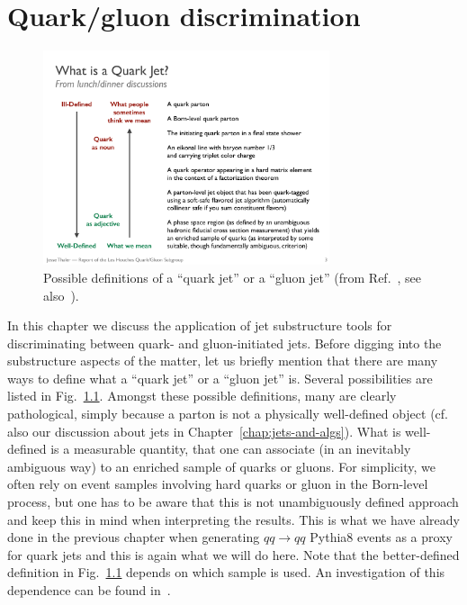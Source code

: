 %

\chapter{Quark/gluon discrimination}\label{sec:calc-shapes-qg}

\begin{figure}
  \centerline{\includegraphics[width=0.75\textwidth]{figures/quark-gluon-jet-definitions.pdf}}
  \caption{Possible definitions of a ``quark jet'' or a
    ``gluon jet'' (from Ref.~\cite{Badger:2016bpw}, see also~\cite{Gras:2017jty}).}\label{fig:qgjet-defs}
\end{figure}

In this chapter we discuss the application of jet substructure tools
for discriminating between quark- and gluon-initiated jets.
%
Before digging into the substructure aspects of the matter, let us
briefly mention that there are many ways to define what a ``quark
jet'' or a ``gluon jet'' is. Several possibilities are listed in
Fig.~\ref{fig:qgjet-defs}. Amongst these possible definitions, many
are clearly pathological, simply because a parton is not a physically
well-defined object (cf. also our discussion about jets in
Chapter~\ref{chap:jets-and-algs}).
%
What is well-defined is a measurable quantity, that one can associate
(in an inevitably ambiguous way) to an enriched sample of quarks or
gluons.
%
For simplicity, we often rely on event samples involving hard quarks
or gluon in the Born-level process, but one has to be aware that this
is not unambiguously defined approach and keep this in mind when interpreting
the results.
%
This is what we have already done in the previous chapter when
generating $qq\to qq$ Pythia8 events as a proxy for quark jets and
this is again what we will do here.
%
Note that the better-defined definition in Fig.~\ref{fig:qgjet-defs}
depends on which sample is used. An investigation of this dependence
can be found in~\cite{Bright-Thonney:2018mxq}.

